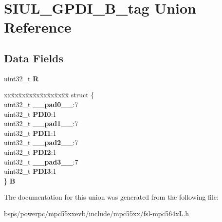 \hypertarget{unionSIUL__GPDI__32B__tag}{}\section{S\+I\+U\+L\+\_\+\+G\+P\+D\+I\+\_\+B\+\_\+tag Union Reference}
\label{unionSIUL__GPDI__32B__tag}
\subsection*{Data Fields}
\begin{DoxyCompactItemize}
\item 
\mbox{\label{unionSIUL__GPDI__32B__tag_a5e33ff843da2bf64f91a5791b4f1bdeb}} 
uint32\+\_\+t {\bfseries R}
\item 
\mbox{\label{unionSIUL__GPDI__32B__tag_ad0d02d5be63dc7a7ff4e420f6b75d2f5}} 
\begin{tabbing}
xx\=xx\=xx\=xx\=xx\=xx\=xx\=xx\=xx\=\kill
struct \{\\
\>uint32\_t {\bfseries \_\_pad0\_\_}:7\\
\>uint32\_t {\bfseries PDI0}:1\\
\>uint32\_t {\bfseries \_\_pad1\_\_}:7\\
\>uint32\_t {\bfseries PDI1}:1\\
\>uint32\_t {\bfseries \_\_pad2\_\_}:7\\
\>uint32\_t {\bfseries PDI2}:1\\
\>uint32\_t {\bfseries \_\_pad3\_\_}:7\\
\>uint32\_t {\bfseries PDI3}:1\\
\} {\bfseries B}\\

\end{tabbing}\end{DoxyCompactItemize}


The documentation for this union was generated from the following file\+:\begin{DoxyCompactItemize}
\item 
bsps/powerpc/mpc55xxevb/include/mpc55xx/fsl-\/mpc564x\+L.\+h\end{DoxyCompactItemize}
